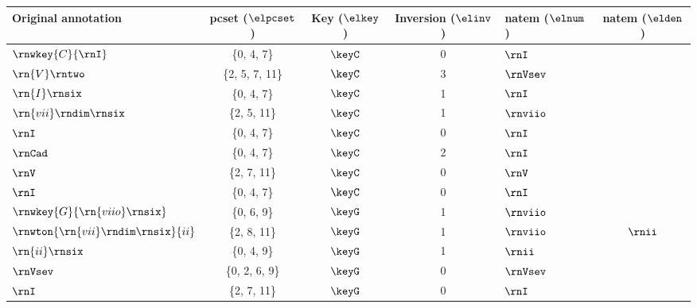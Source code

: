 \begin{tabular}{l|ccc|lc}
Original annotation                 & \gls{pcset} ($\elpcset$)         & Key ($\elkey$)   & Inversion ($\elinv$) & \gls{natem} ($\elnum$) & \gls{natem} ($\elden$) \\ \hline
$\rnwkey{C}{\rnI}$                  & \{0, 4, 7\}     & $\keyC$ & 0     & $\rnI$      &                  \\
$\rn{V}\rntwo$                      & \{2, 5, 7, 11\} & $\keyC$ & 3     & $\rnVsev$   &                  \\
$\rn{I}\rnsix$                      & \{0, 4, 7\}     & $\keyC$ & 1     & $\rnI$      &                  \\
$\rn{vii}\rndim\rnsix$              & \{2, 5, 11\}    & $\keyC$ & 1     & $\rnviio$   &                  \\
$\rnI$                              & \{0, 4, 7\}     & $\keyC$ & 0     & $\rnI$      &                  \\
$\rnCad$                            & \{0, 4, 7\}     & $\keyC$ & 2     & $\rnI$      &                  \\
$\rnV$                              & \{2, 7, 11\}    & $\keyC$ & 0     & $\rnV$      &                  \\
$\rnI$                              & \{0, 4, 7\}     & $\keyC$ & 0     & $\rnI$      &                  \\
$\rnwkey{G}{\rn{viio}\rnsix}$       & \{0, 6, 9\}     & $\keyG$ & 1     & $\rnviio$   &                  \\
$\rnwton{\rn{vii}\rndim\rnsix}{ii}$ & \{2, 8, 11\}    & $\keyG$ & 1     & $\rnviio$   & $\rnii$          \\
$\rn{ii}\rnsix$                     & \{0, 4, 9\}     & $\keyG$ & 1     & $\rnii$     &                  \\
$\rnVsev$                           & \{0, 2, 6, 9\}  & $\keyG$ & 0     & $\rnVsev$   &                  \\
$\rnI$                              & \{2, 7, 11\}    & $\keyG$ & 0     & $\rnI$      &                 
\end{tabular}
